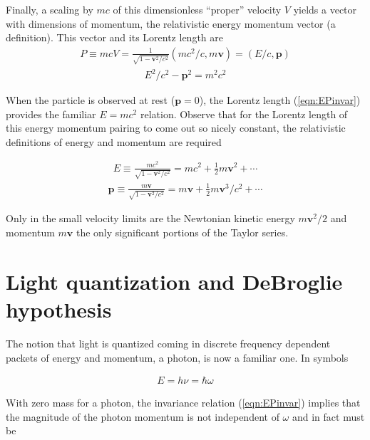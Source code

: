 \documentclass[]{eliblog}
\newcommand{\Bp}[0]{\mathbf{p}}
\newcommand{\Bv}[0]{\mathbf{v}}
\newcommand{\inv}[1]{\frac{1}{#1}}
\begin{document}
Finally, a scaling by $mc$ of this dimensionless ``proper'' velocity $V$ yields a vector with dimensions of momentum, the
relativistic energy momentum vector (a definition).  This vector and its Lorentz length are
\begin{align}\label{eqn:energyMomentum}
P \equiv mc V = \inv{\sqrt{1 - \Bv^2/c^2 }} \left(mc^2/c, m \Bv \right) = (E/c, \Bp)
\end{align}
\begin{align}\label{eqn:EPinvar}
E^2/c^2 - \Bp^2 = m^2 c^2
\end{align}

When the particle is observed at rest ($\Bp=0$), the Lorentz length (\ref{eqn:EPinvar}) provides the familiar $E= m c^2$ relation.
Observe that for the Lorentz length of this energy momentum pairing to come out so nicely constant, the relativistic definitions 
of energy and momentum are required

\begin{align}\label{eqn:Eidentified}
E \equiv \frac{m c^2}{\sqrt{1 - \Bv^2/c^2}} = m c^2 + \inv{2}m \Bv^2 + \cdots
\end{align}
\begin{align}\label{eqn:Pidentified}
\Bp \equiv \frac{m \Bv}{\sqrt{1 - \Bv^2/c^2}} = m \Bv + \inv{2}m \Bv^3/c^2 + \cdots
\end{align}

Only in the small velocity limits are the Newtonian kinetic energy $m\Bv^2/2$ and momentum $m\Bv$ the only significant portions of
the Taylor series.

\section{Light quantization and DeBroglie hypothesis}

The notion that light is quantized coming in discrete frequency dependent packets of energy and momentum, a photon, is now a familiar one.
In symbols

\begin{align}
E = h \nu = \hbar \omega
\end{align}

With zero mass for a photon, the invariance relation (\ref{eqn:EPinvar}) implies that the magnitude of the photon momentum is not independent of $\omega$ and in fact must be 
\end{document}
